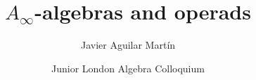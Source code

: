 \documentclass{beamer}
\title{$A_\infty$-algebras and operads}
\author{Javier Aguilar Mart\'in}
\institute{University of Kent}
\date{Junior London Algebra Colloquium}
\theoremstyle{definition}
\begin{document}
\frame{\titlepage}
%
% 
% 
% 

% 



\newcommand{\seti}{\setcounter{saveenumi}{\value{enumi}}}
\newcommand{\conti}{\setcounter{enumi}{\value{saveenumi}}}

\makeatletter
\newcommand{\xRightarrow}[2][]{\ext@arrow 0359\Rightarrowfill@{#1}{#2}}
\makeatother





%
%
%
%
%
\end{document}
